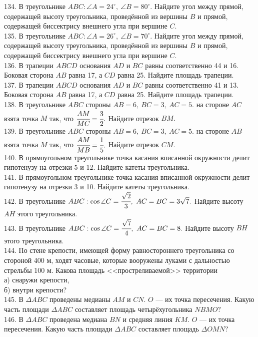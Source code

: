 \documentclass[12pt]{article}
\begin{document}
134. В треугольнике $ABC: \angle A=24^\circ,\ \angle B=80^\circ.$ Найдите угол между прямой, содержащей высоту треугольника, проведённой из вершины $B$ и прямой, содержащей биссектрису внешнего угла при вершине $C.$\\
135. В треугольнике $ABC: \angle A=26^\circ,\ \angle B=70^\circ.$ Найдите угол между прямой, содержащей высоту треугольника, проведённой из вершины $B$ и прямой, содержащей биссектрису внешнего угла при вершине $C.$\\
136. В трапеции $ABCD$ основания $AD$ и $BC$ равны соответственно 44 и 16. Боковая сторона $AB$ равна 17, а $CD$ равна 25. Найдите площадь трапеции.\\
137. В трапеции $ABCD$ основания $AD$ и $BC$ равны соответственно 41 и 13. Боковая сторона $AB$ равна 17, а $CD$ равна 25. Найдите площадь трапеции.\\
138. В треугольнике $ABC$ стороны $AB=6,\ BC=3,\ AC=5.$ на стороне $AC$ взята точка $M$ так, что $\cfrac{AM}{MC}=\cfrac{3}{2}.$ Найдите отрезок $BM.$\\
139. В треугольнике $ABC$ стороны $AB=6,\ BC=3,\ AC=5.$ на стороне $AB$ взята точка $M$ так, что $\cfrac{AM}{MB}=\cfrac{1}{5}.$ Найдите отрезок $CM.$\\
140. В прямоугольном треугольнике точка касания вписанной окружности делит гипотенузу на отрезки 5 и 12. Найдите катеты треугольника.\\
141. В прямоугольном треугольнике точка касания вписанной окружности делит гипотенузу на отрезки 3 и 10. Найдите катеты треугольника.\\
142. В треугольнике $ABC: \cos \angle C=\cfrac{\sqrt{2}}{3},\ AC=BC=3\sqrt{7}.$ Найдите высоту $AH$ этого треугольника.\\
143. В треугольнике $ABC: \cos \angle C=\cfrac{\sqrt{7}}{4},\ AC=BC=8.$ Найдите высоту $BH$ этого треугольника.\\
144. По стене крепости, имеющей форму равностороннего треугольника со стороной 400 м, ходят часовые, которые вооружены луками с дальностью стрельбы 100 м. Какова площадь <<простреливаемой>> территории\\
а) снаружи крепости,\\
б) внутри крепости?\\
145. В $\Delta ABC$ проведены медианы $AM$ и $CN.$
$O$ --- их точка пересечения. Какую часть площади $\Delta ABC$ составляет площадь четырёхугольника $NBMO?$\\
146. В $\Delta ABC$ проведена медиана $BN$ и средняя линия $KM.$ $O$ --- их точка пересечения. Какую часть площади $\Delta ABC$ составляет площадь $\Delta OMN?$\\
\end{document}
